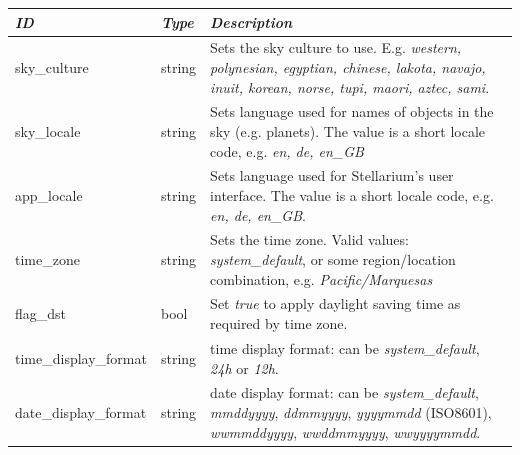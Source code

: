 \begin{tabularx}{\textwidth}{l|l|X}\toprule
\emph{ID}         & \emph{Type} & \emph{Description}\\\midrule
sky\_culture          & string & Sets the sky culture to use. E.g. \emph{western, polynesian, egyptian, chinese, 
                                 lakota, navajo, inuit, korean, norse, tupi, maori, aztec, sami}.\\%
sky\_locale           & string & Sets language used for names of objects in the sky (e.g. planets). 
                                 The value is a short locale code, e.g. \emph{en, de, en\_GB}\\%
app\_locale           & string & Sets language used for Stellarium's user interface. 
                                  The value is a short locale code, e.g. \emph{en, de, en\_GB}.\\%
time\_zone            & string & Sets the time zone. Valid values: \emph{system\_default}, 
                                 or some region/location combination, e.g. \emph{Pacific/Marquesas}\\%
flag\_dst             & bool   & Set \emph{true} to apply daylight saving time as required by time zone.\\
time\_display\_format & string & time display format: can be \emph{system\_default}, \emph{24h} or \emph{12h}.\\%
date\_display\_format & string & date display format: can be \emph{system\_default}, \emph{mmddyyyy}, \emph{ddmmyyyy}, \emph{yyyymmdd} (ISO8601), \emph{wwmmddyyyy}, \emph{wwddmmyyyy}, \emph{wwyyyymmdd}.\\\bottomrule
\end{tabularx}

\subsection{}

